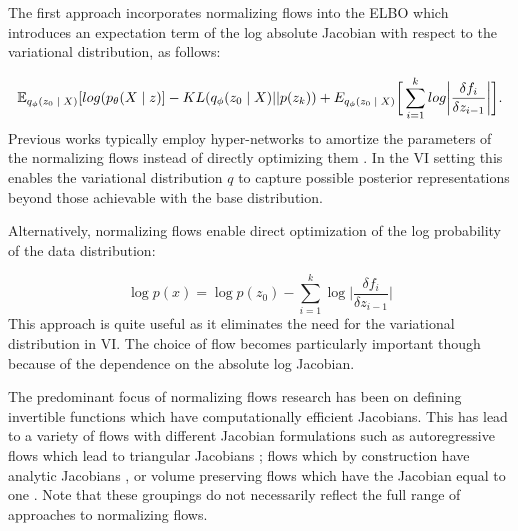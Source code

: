 


The first approach incorporates normalizing flows into the \ac{ELBO} which introduces an expectation term of the log absolute Jacobian with respect to the variational distribution, as follows:

\begin{equation}
\operatorname{\mathbb{E}}_{q_{\phi}(z_{0} \; | \;{X})} [ log(p_{\theta}(X \; | \;{z}) ]  - KL(q_{\phi}(z_{0} \; | \;{X}) || p(z_{k})) + E_{q_{\phi}(z_{0}\; | \;{X})}\bigg[\sum_{i=1}^{k}log \bigg|\frac{\delta f_{i}}{\delta z_{i-1}}\bigg|\bigg].
\end{equation}
Previous works typically employ hyper-networks \cite{ha2016hypernets} to amortize the parameters of the normalizing flows instead of directly optimizing them  \cite{rezende2015VIwithNF,tomczak2016Householder,vdberg2018sylvester}. In the \ac{VI} setting this enables the variational distribution $q$ to capture possible posterior representations beyond those achievable with the base distribution.

Alternatively, normalizing flows enable direct optimization of the log probability of the data distribution:
 
\begin{equation}
	\log p(x) = \log p(z_{0}) - \sum_{i=1}^{k} \log \bigg| \frac{\delta f_{i}}{\delta z_{i-1}} \bigg|
\end{equation}
This approach is quite useful as it eliminates the need for the variational distribution in \ac{VI}. The choice of flow becomes particularly important though because of the dependence on the absolute log Jacobian. %

The predominant focus of normalizing flows research has been on defining invertible functions which have computationally efficient Jacobians. This has lead to a variety of flows with different Jacobian formulations such as autoregressive flows which lead to triangular Jacobians \cite{kingma2016IAF, papamakarios2017MAF}; flows which by construction have analytic Jacobians \cite{rezende2015VIwithNF,vdberg2018sylvester}, or volume preserving flows which have the Jacobian equal to one \cite{tomczak2016Householder,tran2019discreteflows,hoogeboom2019IntegerDiscreteFlows}. Note that these groupings do not necessarily reflect the full range of approaches to normalizing flows.



